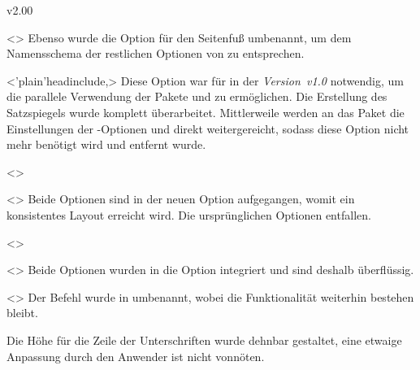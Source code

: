 \begin{Entity}{}
\begin{NoIndexDefault}
\begin{Cessations}{v2.00}
\begin{Cessation}
  {}
  <>
\printdeclarationlist
%
Ebenso wurde die Option für den Seitenfuß umbenannt, um dem Namensschema der 
restlichen Optionen von \TUDScript zu entsprechen.
\end{Cessation}

\begin{Cessation}
  {}
  <\Option'plain'{headinclude},>
\printdeclarationlist
%
Diese Option war für \TUDScript in der \emph{Version~v1.0} notwendig, um die 
parallele Verwendung der Pakete  und  zu 
ermöglichen. Die Erstellung des Satzspiegels wurde komplett überarbeitet. 
Mittlerweile werden an das Paket  die Einstellungen der 
\KOMAScript-Optionen  und  direkt 
weitergereicht, sodass diese Option nicht mehr benötigt wird und entfernt wurde.
\end{Cessation}

\begin{Cessation}
  {}
  <>
\begin{Cessation}
  {}
  <>
\printdeclarationlist
%
Beide Optionen sind in der neuen Option  
aufgegangen, womit ein konsistentes Layout erreicht wird. Die ursprünglichen 
Optionen entfallen. 
\end{Cessation}
\end{Cessation}

\begin{Cessation}
  {}
  <>
\begin{Cessation}
  {}
  <>
\printdeclarationlist
%
Beide Optionen wurden in die Option  integriert und sind 
deshalb überflüssig.
\end{Cessation}
\end{Cessation}

\begin{Cessation}
  {}
  <>
\printdeclarationlist
%
Der Befehl wurde in  umbenannt, wobei die Funktionalität 
weiterhin bestehen bleibt.
\end{Cessation}

\begin{Cessation}
  {}
\printdeclarationlist
%
Die Höhe für die Zeile der Unterschriften wurde dehnbar gestaltet, eine etwaige 
Anpassung durch den Anwender ist nicht vonnöten.
\end{Cessation}


\end{Cessations}
\end{NoIndexDefault}
\end{Entity}
